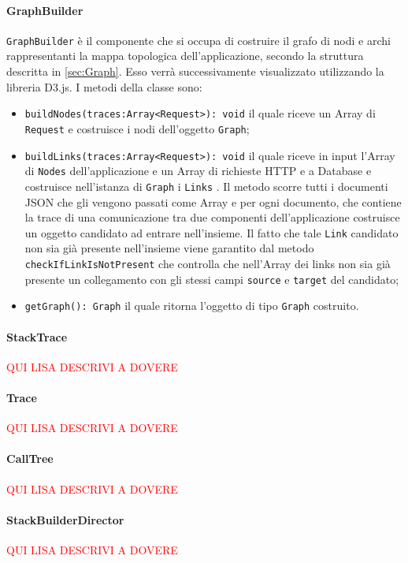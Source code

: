 \paragraph{GraphBuilder} \Spazio
\label{sec:GraphBuilder}
	\texttt{GraphBuilder} è il componente che si occupa di costruire il grafo di nodi e archi rappresentanti la mappa topologica dell'applicazione, secondo la struttura descritta in \ref{sec:Graph}. Esso verrà successivamente visualizzato utilizzando la libreria D3.js. I metodi della classe sono:
	\begin{itemize}
		\item \texttt{buildNodes(traces:Array<Request>): void} il quale riceve un Array di \texttt{Request} e  costruisce i nodi dell'oggetto \texttt{Graph};
				
		\item\texttt{buildLinks(traces:Array<Request>): void} il quale riceve in input l'Array di \texttt{Nodes} dell'applicazione e un Array di richieste HTTP e a Database e costruisce nell'istanza di \texttt{Graph} i \texttt{Links} . Il metodo scorre tutti i documenti JSON che gli vengono passati come Array e per ogni documento, che contiene la trace di una comunicazione tra due componenti dell'applicazione costruisce un oggetto candidato ad entrare nell'insieme. Il fatto che tale \texttt{Link} candidato non sia già presente nell'insieme viene garantito dal metodo \texttt{checkIfLinkIsNotPresent} che controlla che nell'Array dei links non sia già presente un collegamento con gli stessi campi \texttt{source} e \texttt{target} del candidato; 

		\item{\texttt{getGraph(): Graph} il quale ritorna l'oggetto di tipo \texttt{Graph} costruito.  }
	\end{itemize}

\paragraph{StackTrace} \Spazio
\textcolor{red}{QUI LISA DESCRIVI A DOVERE}
\paragraph{Trace} \Spazio
\textcolor{red}{QUI LISA DESCRIVI A DOVERE}
\paragraph{CallTree} \Spazio
\textcolor{red}{QUI LISA DESCRIVI A DOVERE}
\paragraph{StackBuilderDirector} \Spazio
\textcolor{red}{QUI LISA DESCRIVI A DOVERE}
